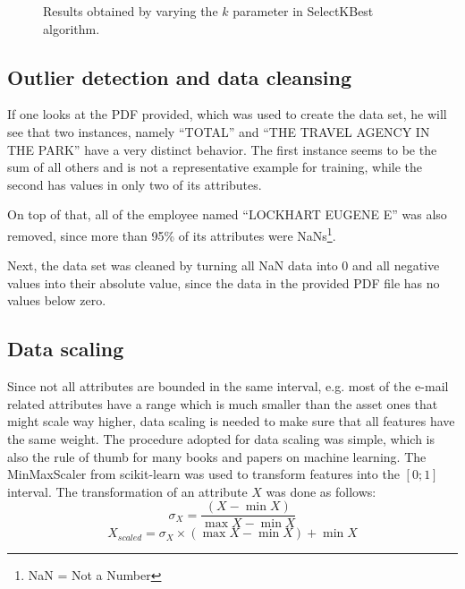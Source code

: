 \documentclass[11pt]{article}
\begin{document}
		\begin{figure}
			\caption{Results obtained by varying the $k$ parameter in SelectKBest algorithm.}
			\label{fig:kVersusMetrics}
		\end{figure}

	\subsection{Outlier detection and data cleansing}
	
		If one looks at the PDF provided, which was used to create the data set, he will see that two instances, namely ``TOTAL'' and ``THE TRAVEL AGENCY IN THE PARK'' have a very distinct behavior.
		The first instance seems to be the sum of all others and is not a representative example for training, while the second has values in only two of its attributes.
	
		On top of that, all of the employee named ``LOCKHART EUGENE E'' was also removed, since more than 95\% of its attributes were NaNs\footnote{NaN = Not a Number}.
		
		Next, the data set was cleaned by turning all NaN data into $0$ and all negative values into their absolute value, since the data in the provided PDF file has no values below zero.
	
	\subsection{Data scaling}

		Since not all attributes are bounded in the same interval, e.g. most of the e-mail related attributes have a range which is much smaller than the asset ones that might scale way higher, data scaling is needed to make sure that all features have the same weight.
		The procedure adopted for data scaling was simple, which is also the rule of thumb for many books and papers on machine learning.
		The MinMaxScaler from scikit-learn was used to transform features into the $[0;1]$ interval.
		The transformation of an attribute $X$ was done as follows:
		\begin{displaymath}
			\sigma_X = \frac{(X - \min{X})}{\max{X} - \min{X}}
		\end{displaymath}
		\begin{displaymath}
			X_{scaled} = \sigma_X \times (\max{X} - \min{X}) + \min{X}
		\end{displaymath}
		
\end{document}
